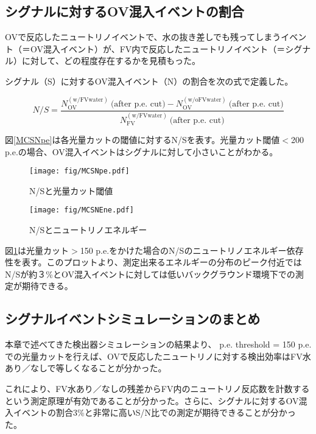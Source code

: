 \documentclass[11pt]{ltjsreport}
\newcommand{\figref}[1]{図\ref{#1}}
\newcommand{\fv}{\mathrm{FV}}
\newcommand{\ov}{\mathrm{OV}}
\newcommand{\ww}{\mathrm{(w/ FVwater)}}
\newcommand{\wow}{\mathrm{(w/o FVwater)}}
\begin{document}
\subsection{シグナルに対するOV混入イベントの割合}
OVで反応したニュートリノイベントで、水の抜き差しでも残ってしまうイベント（＝OV混入イベント）が、FV内で反応したニュートリノイベント（＝シグナル）に対して、どの程度存在するかを見積もった。

シグナル（S）に対するOV混入イベント（N）の割合を次の式で定義した。

\begin{equation}
N/S = \frac{N_{\ov}^{\ww}\ \text{(after p.e. cut)}-N_{\ov}^{\wow}\ \text{(after p.e. cut)}}{N_{\fv}^{\ww}\ \text{(after p.e. cut)}}
\end{equation}

\figref{MCSNpe}は各光量カットの閾値に対するN/Sを表す。光量カット閾値$<$200 p.e.の場合、OV混入イベントはシグナルに対して小さいことがわかる。


\begin{figure}[htbp]
\begin{minipage}{0.47\textwidth}
\centering
\texttt{[image: fig/MCSNpe.pdf]}
\caption[N/Sとp.e. threshold]{N/Sと光量カット閾値}
\label{MCSNpe}
\end{minipage}
\hfill%
\begin{minipage}{0.47\textwidth}
\centering
\texttt{[image: fig/MCSNEne.pdf]}
\caption[N/SとEnergy]{N/Sとニュートリノエネルギー}
\label{MCSNEne}
\end{minipage}
\end{figure}


\figref{MCSNEne}は光量カット$>$150 p.e.をかけた場合のN/Sのニュートリノエネルギー依存性を表す。このプロットより、測定出来るエネルギーの分布のピーク付近ではN/Sが約３\%とOV混入イベントに対しては低いバックグラウンド環境下での測定が期待できる。


\subsection{シグナルイベントシミュレーションのまとめ}
本章で述べてきた検出器シミュレーションの結果より、
p.e. threshold = 150 p.e.での光量カットを行えば、OVで反応したニュートリノに対する検出効率はFV水あり／なしで等しくなることが分かった。

これにより、FV水あり／なしの残差からFV内のニュートリノ反応数を計数するという測定原理が有効であることが分かった。さらに、シグナルに対するOV混入イベントの割合3\%と非常に高いS/N比での測定が期待できることが分かった。
\end{document}
